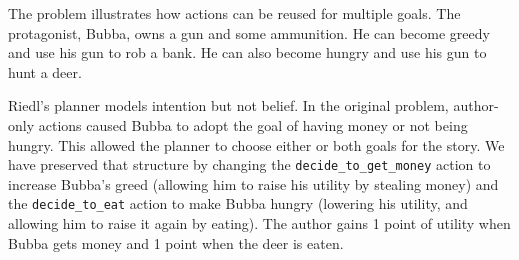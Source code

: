 \documentclass{nilreport}
\begin{document}
\noindent The problem illustrates how actions can be reused for multiple
goals. The protagonist, Bubba, owns a gun and some ammunition. He
can become greedy and use his gun to rob a bank. He can also become
hungry and use his gun to hunt a deer.

Riedl's planner models intention but not belief. In the original problem,
author-only actions caused Bubba to adopt the goal of having money
or not being hungry. This allowed the planner to choose either or
both goals for the story. We have preserved that structure by changing
the \texttt{decide\_to\_get\_money} action to increase Bubba's greed
(allowing him to raise his utility by stealing money) and the \texttt{decide\_to\_eat}
action to make Bubba hungry (lowering his utility, and allowing him
to raise it again by eating). The author gains 1 point of utility
when Bubba gets money and 1 point when the deer is eaten.

\medskip{}
\noindent{}

\medskip{}
\noindent{}
\end{document}
